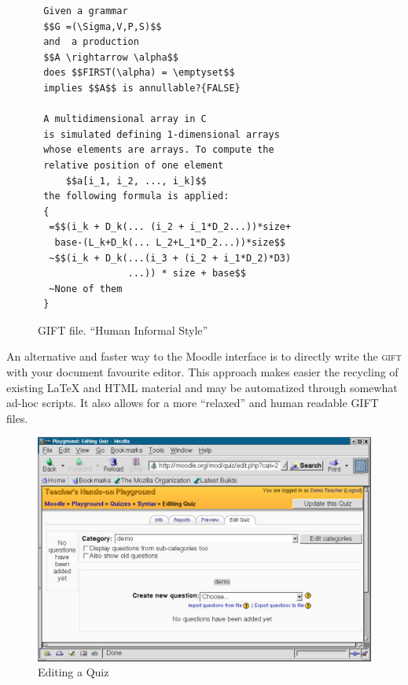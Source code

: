 \documentclass{pracjourn}[2006/02/20]
\begin{document}
\begin{figure}[htb]
\mbox{}\hrulefill
\vspace{-.6em}
\begin{footnotesize}
\begin{verbatim}
 Given a grammar
 $$G =(\Sigma,V,P,S)$$ 
 and  a production 
 $$A \rightarrow \alpha$$ 
 does $$FIRST(\alpha) = \emptyset$$ 
 implies $$A$$ is annullable?{FALSE}
 
 A multidimensional array in C 
 is simulated defining 1-dimensional arrays 
 whose elements are arrays. To compute the 
 relative position of one element  
     $$a[i_1, i_2, ..., i_k]$$   
 the following formula is applied:
 {
  =$$(i_k + D_k(... (i_2 + i_1*D_2...))*size+ 
   base-(L_k+D_k(... L_2+L_1*D_2...))*size$$
  ~$$(i_k + D_k(...(i_3 + (i_2 + i_1*D_2)*D3)
                ...)) * size + base$$
  ~None of them
 } \end{verbatim}
\end{footnotesize}
\vspace{-1.5em}
\hrulefill
\caption{GIFT file. ``Human Informal Style'' }
\label{fig:ficherogifthuman}
\end{figure}

An alternative and faster way 
to the Moodle interface is to directly write the \textsc{gift}
with your document 
favourite editor.
This approach makes easier the recycling of existing \LaTeX{}
and \textsc{HTML} material and may be automatized through somewhat 
ad-hoc scripts. It also allows for a more 
``relaxed'' and human readable \textsc{GIFT} files.


\begin{figure}[!ht]
  \begin{center}
    \includegraphics[scale=0.3]{EditingQuiz}
  \end{center}
\caption{Editing a Quiz}
\label{fig:quiz:1}
\end{figure}
\end{document}
